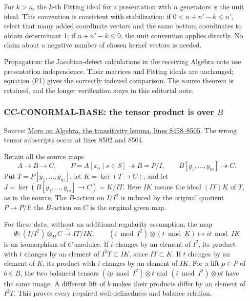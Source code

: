 \documentclass[11pt]{article}
\begin{document}
For \(k>n\), the \(k\)-th Fitting ideal for a presentation with \(n\) generators is the unit ideal. This convention is consistent with stabilization: if \(0<n+n'-k\leq n'\), select that many added coordinate vectors and the same bottom coordinates to obtain determinant 1; if \(n+n'-k\leq0\), the unit convention applies directly. No claim about a negative number of chosen kernel vectors is needed.

Propagation: the Jacobian-defect calculations in the receiving Algebra note use presentation independence. Their matrices and Fitting ideals are unchanged; equation (F1) gives the correctly indexed comparison. The source theorem is retained, and the longer verification stays in this editorial note.

\subsubsection{\texorpdfstring{CC-CONORMAL-BASE: the tensor product is over \(B\)}{CC-CONORMAL-BASE: the tensor product is over B}}\label{cc-conormal-base-the-tensor-product-is-over-b}

Source: \href{https://github.com/stacks/stacks-project/blob/a04446e57ec1fbc252a871afcec7752fb2807b14/more-algebra.tex\#L8458}{More on Algebra, the transitivity lemma, lines 8458--8505}. The wrong tensor subscripts occur at lines 8502 and 8504.

Retain all the source maps \[
 A\longrightarrow B\longrightarrow C,\qquad
 P=A[x_s\mid s\in S]\twoheadrightarrow B=P/I,\qquad
 B[y_1,\ldots,y_m]\twoheadrightarrow C.
\] Put \(T=P[y_1,\ldots,y_m]\), let \(K=\ker(T\to C)\), and let \(J=\ker(B[y_1,\ldots,y_m]\to C)=K/IT\). Here \(IK\) means the ideal \((IT)K\) of \(T\), as in the source. The \(B\)-action on \(I/I^2\) is induced by the original quotient \(P\to P/I\); the \(B\)-action on \(C\) is the original given map.

For these data, without an additional regularity assumption, the map \[
 \Phi:(I/I^2)\otimes_B C\xrightarrow{\ \sim\ }IT/IK,
 \qquad (i\bmod I^2)\otimes(t\bmod K)\longmapsto it\bmod IK
\tag{C1}
\] is an isomorphism of \(C\)-modules. If \(i\) changes by an element of \(I^2\), its product with \(t\) changes by an element of \(I^2T\subset IK\), since \(IT\subset K\). If \(t\) changes by an element of \(K\), its product with \(i\) changes by an element of \(IK\). For a lift \(p\in P\) of \(b\in B\), the two balanced tensors \((ip\bmod I^2)\otimes\bar t\) and \((i\bmod I^2)\otimes\overline{pt}\) have the same image. A different lift of \(b\) makes their products differ by an element of \(I^2T\). This proves every required well-definedness and balance relation.
\end{document}
